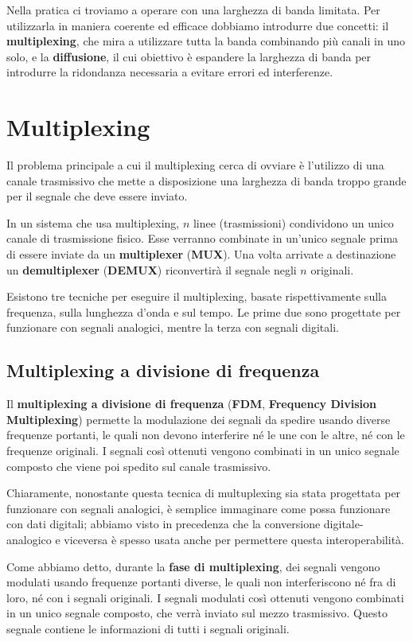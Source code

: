 Nella pratica ci troviamo a operare con una larghezza di banda limitata. Per utilizzarla in maniera coerente ed efficace dobbiamo introdurre due concetti: il \textbf{multiplexing}, che mira a utilizzare tutta la banda combinando più canali in uno solo, e la \textbf{diffusione}, il cui obiettivo è espandere la larghezza di banda per introdurre la ridondanza necessaria a evitare errori ed interferenze.

\section{Multiplexing}
    Il problema principale a cui il multiplexing cerca di ovviare è l'utilizzo di una canale trasmissivo che mette a disposizione una larghezza di banda troppo grande per il segnale che deve essere inviato.
    
    In un sistema che usa multiplexing, $n$ linee (trasmissioni) condividono un unico canale di trasmissione fisico. Esse verranno combinate in un'unico segnale prima di essere inviate da un \textbf{multiplexer} (\textbf{MUX}). Una volta arrivate a destinazione un \textbf{demultiplexer} (\textbf{DEMUX}) riconvertirà il segnale negli $n$ originali.
    
    Esistono tre tecniche per eseguire il multiplexing, basate rispettivamente sulla frequenza, sulla lunghezza d'onda e sul tempo. Le prime due sono progettate per funzionare con segnali analogici, mentre la terza con segnali digitali.
    
    \subsection{Multiplexing a divisione di frequenza}
        Il \textbf{multiplexing a divisione di frequenza} (\textbf{FDM}, \textbf{Frequency Division Multiplexing}) permette la modulazione dei segnali da spedire usando diverse frequenze portanti, le quali non devono interferire né le une con le altre, né con le frequenze originali. I segnali così ottenuti vengono combinati in un unico segnale composto che viene poi spedito sul canale trasmissivo.
        
        Chiaramente, nonostante questa tecnica di multuplexing sia stata progettata per funzionare con segnali analogici, è semplice immaginare come possa funzionare con dati digitali; abbiamo visto in precedenza che la conversione digitale-analogico e viceversa è spesso usata anche per permettere questa interoperabilità.
        
        Come abbiamo detto, durante la \textbf{fase di multiplexing}, dei segnali vengono modulati usando frequenze portanti diverse, le quali non interferiscono né fra di loro, né con i segnali originali. I segnali modulati così ottenuti vengono combinati in un unico segnale composto, che verrà inviato sul mezzo trasmissivo. Questo segnale contiene le informazioni di tutti i segnali originali.
        
